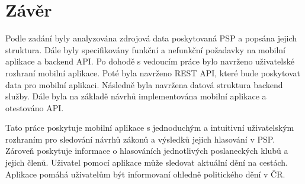 \chapter{Závěr}

Podle zadání byly analyzována zdrojová data poskytovaná PSP a popsána jejich struktura. Dále byly specifikovány funkční a nefunkční požadavky na mobilní aplikace a backend API. Po dohodě s vedoucím práce bylo navrženo uživatelské rozhraní mobilní aplikace. Poté byla navrženo REST API, které bude poskytovat data pro mobilní aplikaci. Následně byla navržena datová struktura backend služby. Dále byla na základě návrhů implementována mobilní aplikace a otestováno API.

Tato práce poskytuje mobilní aplikace s jednoduchým a intuitivní uživatelským rozhraním pro sledování návrhů zákonů a výsledků jejich hlasování v PSP. Zároveň poskytuje informace o hlasováních jednotlivých poslaneckých klubů a jejich členů. Uživatel pomocí aplikace může sledovat aktuální dění na cestách. Aplikace pomáhá uživatelům být informovaní ohledně politického dění v ČR.